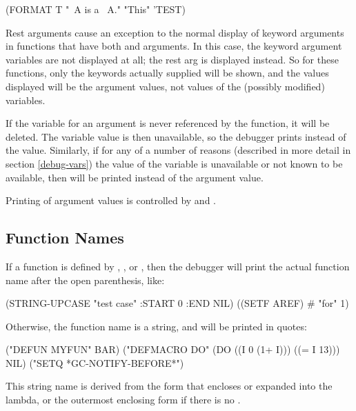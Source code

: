 \begin{example}
(FORMAT T "~A is a ~A." "This" 'TEST)
\end{example}

Rest arguments cause an exception to the normal display of keyword
arguments in functions that have both \code{\amprest} and 
arguments.  In this case, the keyword argument variables are not
displayed at all; the rest arg is displayed instead.  So for these
functions, only the keywords actually supplied will be shown, and the
values displayed will be the argument values, not values of the
(possibly modified) variables.

If the variable for an argument is never referenced by the function, it will be
deleted.  The variable value is then unavailable, so the debugger prints
 instead of the value.  Similarly, if for any of a number of
reasons (described in more detail in section \ref{debug-vars}) the value of the
variable is unavailable or not known to be available, then
 will be printed instead of the argument value.

Printing of argument values is controlled by  and
.

\subsection{Function Names}

If a function is defined by , , or , then the
debugger will print the actual function name after the open parenthesis, like:

\begin{example}
(STRING-UPCASE "test case" :START 0 :END NIL)
((SETF AREF) \# "for" 1)
\end{example}

Otherwise, the function name is a string, and will be printed in quotes:

\begin{example}
("DEFUN MYFUN" BAR)
("DEFMACRO DO" (DO ((I 0 (1+ I))) ((= I 13))) NIL)
("SETQ *GC-NOTIFY-BEFORE*")
\end{example}

This string name is derived from the  form
that encloses or expanded into the lambda, or the outermost enclosing
form if there is no .

